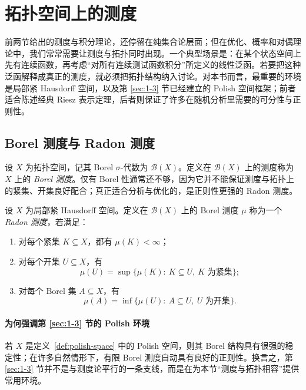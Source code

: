 \section{拓扑空间上的测度}

\label{sec:2-3}

前两节给出的测度与积分理论，还停留在纯集合论层面；但在优化、概率和对偶理论中，我们常常需要让测度与拓扑同时出现。一个典型场景是：在某个状态空间上先有连续函数，再考虑“对所有连续测试函数积分”所定义的线性泛函。若要把这种泛函解释成真正的测度，就必须把拓扑结构纳入讨论。对本书而言，最重要的环境是局部紧 Hausdorff 空间，以及第 \ref{sec:1-3} 节已经建立的 Polish 空间框架；前者适合陈述经典 Riesz 表示定理，后者则保证了许多在随机分析里需要的可分性与正则性。

\subsection{Borel 测度与 Radon 测度}

设 $X$ 为拓扑空间，记其 Borel $\sigma$-代数为 $\mathcal B(X)$。定义在 $\mathcal B(X)$ 上的测度称为 $X$ 上的 \emph{Borel 测度}。仅有 Borel 性通常还不够，因为它并不能保证测度与拓扑上的紧集、开集良好配合；真正适合分析与优化的，是正则性更强的 Radon 测度。

\begin{definition}[Radon 测度]\label{def:radon-measure}
设 $X$ 为局部紧 Hausdorff 空间。定义在 $\mathcal B(X)$ 上的 Borel 测度 $\mu$ 称为一个\emph{Radon 测度}，若满足：
\begin{enumerate}
  \item 对每个紧集 $K\subseteq X$，都有 $\mu(K)<\infty$；
  \item 对每个开集 $U\subseteq X$，有
  \[
  \mu(U)=\sup\{\mu(K):\ K\subseteq U,\ K\text{ 为紧集}\};
  \]
  \item 对每个 Borel 集 $A\subseteq X$，有
  \[
  \mu(A)=\inf\{\mu(U):\ A\subseteq U,\ U\text{ 为开集}\}.
  \]
\end{enumerate}
\end{definition}

\paragraph{为何强调第 \ref{sec:1-3} 节的 Polish 环境}

\begin{remark}
若 $X$ 是定义~\ref{def:polish-space} 中的 Polish 空间，则其 Borel 结构具有很强的稳定性；在许多自然情形下，有限 Borel 测度自动具有良好的正则性。换言之，第 \ref{sec:1-3} 节并不是与测度论平行的一条支线，而是在为本节“测度与拓扑相容”提供常用环境。
\end{remark}

